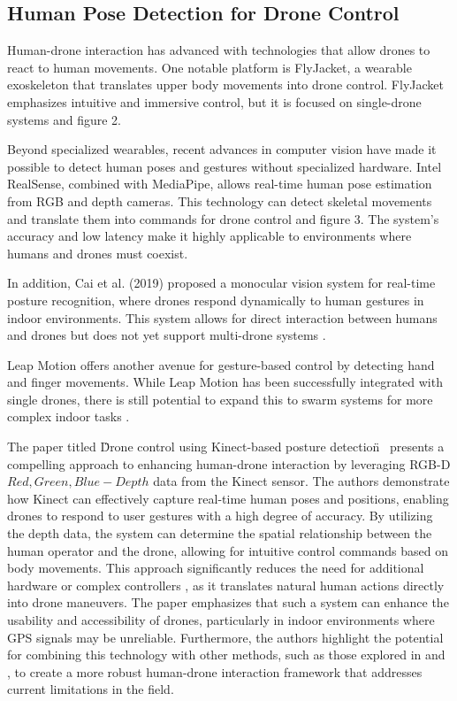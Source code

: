 \subsection{Human Pose Detection for Drone Control}

Human-drone interaction has advanced with technologies that allow drones to react to human movements. One notable platform is FlyJacket, a wearable exoskeleton that translates upper body movements into drone control. FlyJacket emphasizes intuitive and immersive control, but it is focused on single-drone systems \cite{flyjacket} and figure 2.

Beyond specialized wearables, recent advances in computer vision have made it possible to detect human poses and gestures without specialized hardware. Intel RealSense, combined with MediaPipe, allows real-time human pose estimation from \gls{RGB} and depth cameras. This technology can detect skeletal movements and translate them into commands for drone control \cite{realsense_mediapipe} and figure 3. The system’s accuracy and low latency make it highly applicable to environments where humans and drones must coexist.

In addition, Cai et al. (2019) proposed a monocular vision system for real-time posture recognition, where drones respond dynamically to human gestures in indoor environments. This system allows for direct interaction between humans and drones but does not yet support multi-drone systems \cite{cai_human_drone}.

Leap Motion offers another avenue for gesture-based control by detecting hand and finger movements. While Leap Motion has been successfully integrated with single drones, there is still potential to expand this to swarm systems for more complex indoor tasks \cite{leap_motion}.

The paper titled \"Drone control using Kinect-based posture detection\"~\cite{realsense_mediapipe} presents a compelling approach to enhancing human-drone interaction by leveraging \gls{RGB-D} \(Red, Green, Blue-Depth\) data from the Kinect sensor. The authors demonstrate how Kinect can effectively capture real-time human poses and positions, enabling drones to respond to user gestures with a high degree of accuracy. By utilizing the depth data, the system can determine the spatial relationship between the human operator and the drone, allowing for intuitive control commands based on body movements.
This approach significantly reduces the need for additional hardware or complex controllers \cite{noauthor_projection_nodate}, as it translates natural human actions directly into drone maneuvers. The paper emphasizes that such a system can enhance the usability and accessibility of drones, particularly in indoor environments where GPS signals may be unreliable. Furthermore, the authors highlight the potential for combining this technology with other methods, such as those explored in \cite{realsense_mediapipe} and \cite{flyjacket}, to create a more robust human-drone interaction framework that addresses current limitations in the field.

